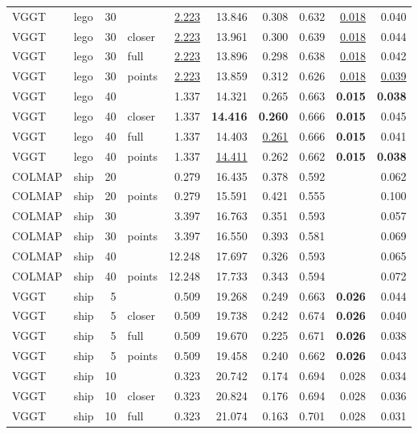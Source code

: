 \begin{table}[H]
\begin{tabular}{llrlrrrrrr}
VGGT & lego & 30 &  & \underline{2.223} & 13.846 & 0.308 & 0.632 & \underline{0.018} & 0.040 \\
VGGT & lego & 30 & closer & \underline{2.223} & 13.961 & 0.300 & 0.639 & \underline{0.018} & 0.044 \\
VGGT & lego & 30 & full & \underline{2.223} & 13.896 & 0.298 & 0.638 & \underline{0.018} & 0.042 \\
VGGT & lego & 30 & points & \underline{2.223} & 13.859 & 0.312 & 0.626 & \underline{0.018} & \underline{0.039} \\
VGGT & lego & 40 &  & 1.337 & 14.321 & 0.265 & 0.663 & \textbf{0.015} & \textbf{0.038} \\
VGGT & lego & 40 & closer & 1.337 & \textbf{14.416} & \textbf{0.260} & 0.666 & \textbf{0.015} & 0.045 \\
VGGT & lego & 40 & full & 1.337 & 14.403 & \underline{0.261} & 0.666 & \textbf{0.015} & 0.041 \\
VGGT & lego & 40 & points & 1.337 & \underline{14.411} & 0.262 & 0.662 & \textbf{0.015} & \textbf{0.038} \\
\midrule
COLMAP & ship & 20 &  & 0.279 & 16.435 & 0.378 & 0.592 &  & 0.062 \\
COLMAP & ship & 20 & points & 0.279 & 15.591 & 0.421 & 0.555 &  & 0.100 \\
COLMAP & ship & 30 &  & 3.397 & 16.763 & 0.351 & 0.593 &  & 0.057 \\
COLMAP & ship & 30 & points & 3.397 & 16.550 & 0.393 & 0.581 &  & 0.069 \\
COLMAP & ship & 40 &  & 12.248 & 17.697 & 0.326 & 0.593 &  & 0.065 \\
COLMAP & ship & 40 & points & 12.248 & 17.733 & 0.343 & 0.594 &  & 0.072 \\
VGGT & ship & 5 &  & 0.509 & 19.268 & 0.249 & 0.663 & \textbf{0.026} & 0.044 \\
VGGT & ship & 5 & closer & 0.509 & 19.738 & 0.242 & 0.674 & \textbf{0.026} & 0.040 \\
VGGT & ship & 5 & full & 0.509 & 19.670 & 0.225 & 0.671 & \textbf{0.026} & 0.038 \\
VGGT & ship & 5 & points & 0.509 & 19.458 & 0.240 & 0.662 & \textbf{0.026} & 0.043 \\
VGGT & ship & 10 &  & 0.323 & 20.742 & 0.174 & 0.694 & 0.028 & 0.034 \\
VGGT & ship & 10 & closer & 0.323 & 20.824 & 0.176 & 0.694 & 0.028 & 0.036 \\
VGGT & ship & 10 & full & 0.323 & 21.074 & 0.163 & 0.701 & 0.028 & 0.031 \\

\end{tabular}
\end{table}
